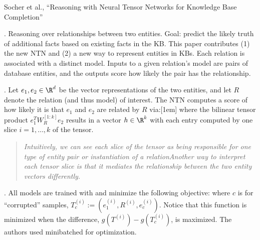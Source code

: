 \documentclass[11pt]{article}
\begin{document}

\vspace{-1em}
{\footnotesize Socher et al., ``Reasoning with Neural Tensor Networks for Knowledge Base Completion''}

\p {}. Reasoning over relationships between two entities. Goal: predict the likely truth of additional facts based on existing facts in the KB. This paper contributes (1) the new NTN and (2) a new way to represent entities in KBs. Each relation is associated with a distinct model. Inputs to a given relation's model are pairs of database entities, and the outputs score how likely the pair has the relationship.

\myspace
\p {}. Let $e_1, e_2 \in \R^d$ be the vector representations of the two entities, and let $R$ denote the relation (and thus model) of interest. The NTN computes a score of how likely it is that $e_1$ and $e_2$ are related by $R$ via:[1em]
where the bilinear tensor product $e_1^T W_R^{[1:k]} e_2$ results in a vector $h \in \R^k$ with each entry computed by one slice $i = 1,\ldots,k$ of the tensor.
\begin{quote}
	{\itshape Intuitively, we can see each slice of the tensor as being responsible for one type of entity pair or instantiation
		of a relation\textellipsis Another way to interpret each tensor slice is that it mediates the relationship between the two entity vectors differently.}
\end{quote}

\myspace
\p {}. All models are trained with  and minimize the following objective:
where $c$ is for ``corrupted'' samples, $T_c^{(i)} := \left(e_1^{(i)}, R^{(i)}, e_c^{(i)}\right)$. Notice that this function is minimized when the difference, $g\left( T^{(i)} \right) - g\left( T_c^{(i)} \right)$, is maximized. The authors used minibatched  for optimization.
\end{document}
